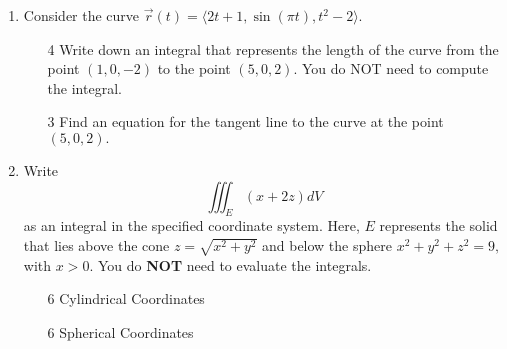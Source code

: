 \documentclass[addpoints,12pt]{exam}
\begin{document}
\begin{enumerate}
\item Consider the curve $\vec{r}(t) = \langle 2t+1, \sin(\pi t), t^2 -2 \rangle.$
\begin{itemize}
\item[4] Write down an integral that represents the length of the curve from the point $(1, 0, -2)$
to the point $(5, 0, 2).$ You do NOT need to compute the integral.
\vfill
\item[3] Find an equation for the tangent line to the curve at the point $(5, 0, 2).$
\vfill
\end{itemize}
\newpage
\newpage
\item Write
$$\displaystyle\iiint_{E} (x +2z) dV$$
as an integral in the specified coordinate system. Here, $E$ represents the solid that lies above
the cone $z = \sqrt{x^2+y^2}$ and below the sphere $x^2+y^2+z^2 = 9, $ with $x>0.$ You do
\textbf{NOT} need to evaluate the integrals.
\begin{itemize}
\item[6] Cylindrical Coordinates
\vfill
\item[6]Spherical Coordinates

\end{itemize}
\end{enumerate}
\end{document}
